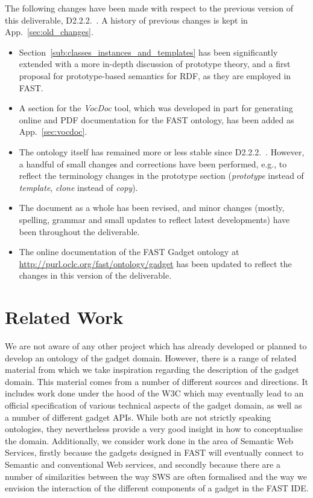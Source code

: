 \documentclass{article}
\begin{document}
The following changes have been made with respect to the previous version of this deliverable, D2.2.2.~\cite{moeller2010fast_ontology}. A history of previous changes is kept in App.~\ref{sec:old_changes}.

\begin{itemize}
	\item Section~\ref{sub:classes_instances_and_templates} has been significantly extended with a more in-depth discussion of prototype theory, and a first proposal for prototype-based semantics for RDF, as they are employed in FAST.
	\item A section for the \emph{VocDoc} tool, which was developed in part for generating online and PDF documentation for the FAST ontology, has been added as App.~\ref{sec:vocdoc}.
	\item The ontology itself has remained more or less stable since D2.2.2.~\cite{moeller2010fast_ontology}. However, a handful of small changes and corrections have been performed, e.g., to reflect the terminology changes in the prototype section (\emph{prototype} instead of \emph{template}, \emph{clone} instead of \emph{copy}).
	\item The document as a whole has been revised, and minor changes (mostly, spelling, grammar and small updates to reflect latest developments) have been throughout the deliverable.
	\item The online documentation of the FAST Gadget ontology at \url{http://purl.oclc.org/fast/ontology/gadget} has been updated to reflect the changes in this version of the deliverable.
\end{itemize}



\clearpage
\section{Related Work} %
\label{sec:related_work}

We are not aware of any other project which has already developed or planned to develop an ontology of the gadget domain. However, there is a range of related material from which we take inspiration regarding the description of the gadget domain. This material comes from a number of different sources and directions. It includes work done under the hood of the W3C which may eventually lead to an official specification of various technical aspects of the gadget domain, as well as a number of different gadget APIs. While both are not strictly speaking ontologies, they nevertheless provide a very good insight in how to conceptualise the domain. Additionally, we consider work done in the area of Semantic Web Services, firstly because the gadgets designed in FAST will eventually connect to Semantic and conventional Web services, and secondly because there are a number of similarities between the way SWS are often formalised and the way we envision the interaction of the different components of a gadget in the FAST IDE.
\end{document}
